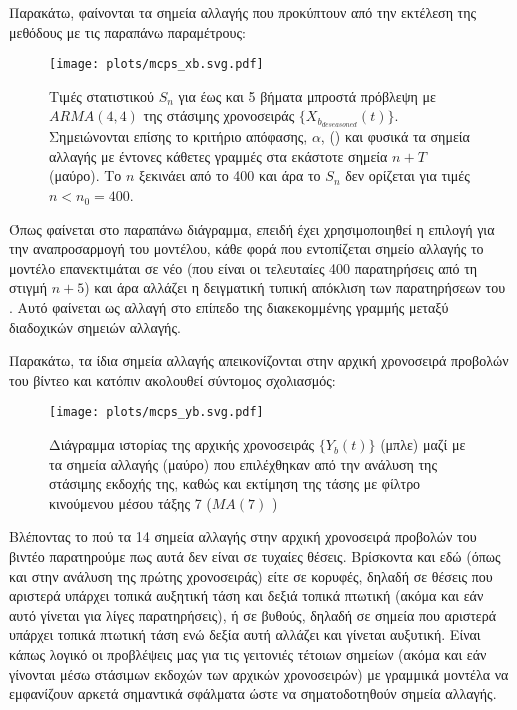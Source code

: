 \par Παρακάτω, φαίνονται τα σημεία αλλαγής που προκύπτουν από την εκτέλεση της μεθόδους με τις παραπάνω παραμέτρους:

\begin{figure}[H]
    \begin{center}
        \texttt{[image: plots/mcps\_xb.svg.pdf]}
        \caption{Τιμές στατιστικού $S_n$ για έως και 5 βήματα μπροστά πρόβλεψη με $ARMA(4,4)$ της στάσιμης χρονοσειράς $\{X_{b_{deseasoned}}(t)\}$. Σημειώνονται επίσης το κριτήριο απόφασης, $\alpha$, () και φυσικά τα σημεία αλλαγής με έντονες κάθετες γραμμές στα εκάστοτε σημεία $n+T$ (μαύρο). Το $n$ ξεκινάει από το 400 και άρα το $S_n$ δεν ορίζεται για τιμές $n<n_0=400$.}
        \label{fig:mcps_xb}
    \end{center}
\end{figure}

Όπως φαίνεται στο παραπάνω διάγραμμα, επειδή έχει χρησιμοποιηθεί η επιλογή  για την αναπροσαρμογή του μοντέλου, κάθε φορά που εντοπίζεται σημείο αλλαγής το μοντέλο επανεκτιμάται σε νέο  (που είναι οι τελευταίες 400 παρατηρήσεις από τη στιγμή $n+5$) και άρα αλλάζει η δειγματική τυπική απόκλιση των παρατηρήσεων του . Αυτό φαίνεται ως αλλαγή στο επίπεδο της  διακεκομμένης γραμμής μεταξύ διαδοχικών σημειών αλλαγής. 

\par Παρακάτω, τα ίδια σημεία αλλαγής απεικονίζονται στην αρχική χρονοσειρά προβολών του βίντεο  και κατόπιν ακολουθεί σύντομος σχολιασμός:

\begin{figure}[H]
    \begin{center}
        \texttt{[image: plots/mcps\_yb.svg.pdf]}
        \caption{Διάγραμμα ιστορίας της αρχικής χρονοσειράς $\{Y_b(t)\}$ (μπλε) μαζί με τα σημεία αλλαγής (μαύρο) που επιλέχθηκαν από την ανάλυση της στάσιμης εκδοχής της, καθώς και εκτίμηση της τάσης με φίλτρο κινούμενου μέσου τάξης 7 ($MA(7)$ )}
        \label{fig:mcps_yb}
    \end{center}
\end{figure}

Βλέποντας το πού  τα 14 σημεία αλλαγής στην αρχική χρονοσειρά προβολών του βιντέο  παρατηρούμε πως αυτά δεν είναι σε τυχαίες θέσεις. Βρίσκοντα και εδώ (όπως και στην ανάλυση της πρώτης χρονοσειράς) είτε σε κορυφές, δηλαδή σε θέσεις που αριστερά υπάρχει τοπικά αυξητική τάση και δεξιά τοπικά πτωτική (ακόμα και εάν αυτό γίνεται για λίγες παρατηρήσεις), ή σε βυθούς, δηλαδή σε σημεία που αριστερά υπάρχει τοπικά πτωτική τάση ενώ δεξία αυτή αλλάζει και γίνεται αυξυτική. Είναι κάπως λογικό οι προβλέψεις μας για τις γειτονιές τέτοιων σημείων (ακόμα και εάν γίνονται μέσω στάσιμων εκδοχών των αρχικών χρονοσειρών) με γραμμικά μοντέλα να εμφανίζουν αρκετά σημαντικά σφάλματα ώστε να σηματοδοτηθούν σημεία αλλαγής.

